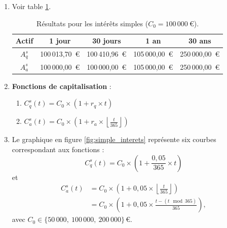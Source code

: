 \documentclass{article}
\begin{document}
\begin{enumerate}[label=\textbf{R1.\arabic*}]
                \item Voir table \ref{tab:simple_interest_results}.
                \begin{table}[h!]
                    \centering
                    \begin{tabular}{|c|c|c|c|c|}
                        \hline
                        \textbf{Actif} & \textbf{1 jour}  & \textbf{30 jours} & \textbf{1 an}    & \textbf{30 ans}  \\
                        \hline
                        \( A_q^s \)    & 100\,013,70\ € & 100\,410,96\ €  & 105\,000,00\ € & 250\,000,00\ € \\
                        \hline
                        \( A_a^s \)    & 100\,000,00\ € & 100\,000,00\ €  & 105\,000,00\ € & 250\,000,00\ € \\
                        \hline
                    \end{tabular}
                    \caption{Résultats pour les intérêts simples (\( C_0 = 100\,000\ \text{€} \)).}
                    \label{tab:simple_interest_results}
                \end{table}

                \item \textbf{Fonctions de capitalisation} :
                \begin{enumerate}[label=(\alph*)]
                    \item \( C_q^s(t) = C_0 \times \left(1 + r_q \times t\right) \)
                    \item \( C_a^s(t) = C_0 \times \left(1 + r_a \times \left\lfloor\frac{t}{365}\right\rfloor\right) \)
                \end{enumerate}

                \item Le graphique en figure \ref{fig:simple_interets} représente six courbes correspondant aux fonctions :
                \[
                C_q^s(t) = C_0 \times \left(1 + \frac{0{,}05}{365} \times t\right)
                \]
                et
                \[
                \begin{aligned}
                    C_a^s(t) & = C_0 \times \left(1 + 0{,}05 \times \left\lfloor\frac{t}{365}\right\rfloor\right) \\
                    & = C_0 \times \left(1 + 0{,}05 \times \frac{t - (t \!\!\!\mod 365)}{365}\right),    
                \end{aligned}
                \]
                avec \( C_0 \in \bigl\{50\,000,\ 100\,000,\ 200\,000\bigr\}\,\text{€} \).


\end{enumerate}
\end{document}
